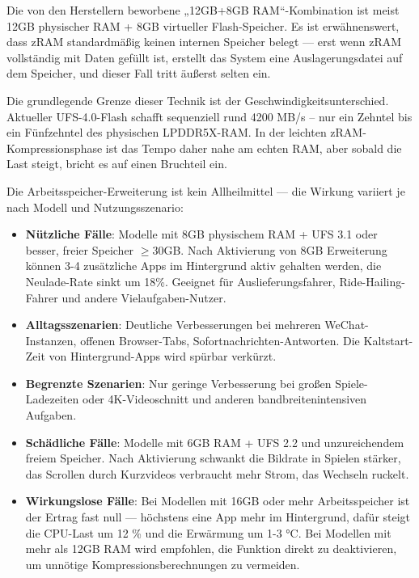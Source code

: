 Die von den Herstellern beworbene „12GB+8GB RAM“-Kombination ist meist 12GB physischer RAM + 8GB virtueller Flash-Speicher. Es ist erwähnenswert, dass zRAM standardmäßig keinen internen Speicher belegt — erst wenn zRAM vollständig mit Daten gefüllt ist, erstellt das System eine Auslagerungsdatei auf dem Speicher, und dieser Fall tritt äußerst selten ein.


Die grundlegende Grenze dieser Technik ist der Geschwindigkeitsunterschied. Aktueller UFS-4.0-Flash schafft sequenziell rund 4200 MB/s – nur ein Zehntel bis ein Fünfzehntel des physischen LPDDR5X-RAM. In der leichten zRAM-Kompressionsphase ist das Tempo daher nahe am echten RAM, aber sobald die Last steigt, bricht es auf einen Bruchteil ein.


Die Arbeitsspeicher-Erweiterung ist kein Allheilmittel — die Wirkung variiert je nach Modell und Nutzungsszenario:

\begin{itemize}
  \item \textbf{Nützliche Fälle}: Modelle mit 8GB physischem RAM + UFS 3.1 oder besser, freier Speicher $\geq$30GB. Nach Aktivierung von 8GB Erweiterung können 3-4 zusätzliche Apps im Hintergrund aktiv gehalten werden, die Neulade-Rate sinkt um 18\%. Geeignet für Auslieferungsfahrer, Ride-Hailing-Fahrer und andere Vielaufgaben-Nutzer.
  \item \textbf{Alltagsszenarien}: Deutliche Verbesserungen bei mehreren WeChat-Instanzen, offenen Browser-Tabs, Sofortnachrichten-Antworten. Die Kaltstart-Zeit von Hintergrund-Apps wird spürbar verkürzt.
  \item \textbf{Begrenzte Szenarien}: Nur geringe Verbesserung bei großen Spiele-Ladezeiten oder 4K-Videoschnitt und anderen bandbreitenintensiven Aufgaben.
  \item \textbf{Schädliche Fälle}: Modelle mit 6GB RAM + UFS 2.2 und unzureichendem freiem Speicher. Nach Aktivierung schwankt die Bildrate in Spielen stärker, das Scrollen durch Kurzvideos verbraucht mehr Strom, das Wechseln ruckelt.
  \item \textbf{Wirkungslose Fälle}: Bei Modellen mit 16GB oder mehr Arbeitsspeicher ist der Ertrag fast null — höchstens eine App mehr im Hintergrund, dafür steigt die CPU-Last um 12 \% und die Erwärmung um 1-3 °C. Bei Modellen mit mehr als 12GB RAM wird empfohlen, die Funktion direkt zu deaktivieren, um unnötige Kompressionsberechnungen zu vermeiden.
\end{itemize}

